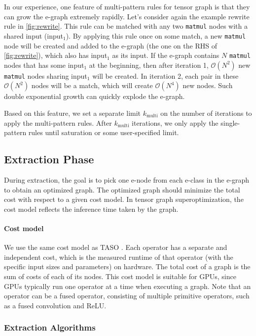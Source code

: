 In our experience, one feature of multi-pattern rules for tensor graph is that they can grow the e-graph extremely rapidly.
Let's consider again the example rewrite rule in \autoref{fig:rewrite}.
This rule can be matched with any two \texttt{matmul} nodes with a shared input (input$_1$).
By applying this rule once on some match, a new \texttt{matmul} node will be created and added to the e-graph (the one on the RHS of \autoref{fig:rewrite}), which also has input$_1$ as its input.
If the e-graph contains $N$ \texttt{matmul} nodes that has some input$_1$ at the beginning, then after iteration 1, $\mathcal{O}(N^2)$ new \texttt{matmul} nodes sharing input$_1$ will be created.
In iteration 2, each pair in these $\mathcal{O}(N^2)$ nodes will be a match, which will create $\mathcal{O}(N^4)$ new nodes.
Such double exponential growth can quickly explode the e-graph.

Based on this feature, we set a separate limit $k_{\textrm{multi}}$ on the number of iterations to apply the multi-pattern rules.
After $k_{\textrm{multi}}$ iterations, we only apply the single-pattern rules until saturation or some user-specified limit.


\subsection{Extraction Phase}

During extraction, the goal is to pick one e-node from each e-class in the e-graph to obtain an optimized graph.
The optimized graph should minimize the total cost with respect to a given cost model.
In tensor graph superoptimization, the cost model reflects the inference time taken by the graph.

\paragraph{Cost model}
We use the same cost model as TASO \cite{taso}.
Each operator has a separate and independent cost, which is the measured runtime of that operator (with the specific input sizes and parameters) on hardware.
The total cost of a graph is the sum of costs of each of its nodes.
This cost model is suitable for GPUs, since GPUs typically run one operator at a time when executing a graph.
Note that an operator can be a fused operator, consisting of multiple primitive operators, such as a fused convolution and ReLU.

\subsubsection{Extraction Algorithms}
\label{sec:extraction}

